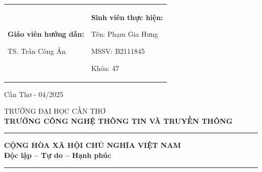 \documentclass[13pt, a4paper]{report}
\begin{document}
\begin{titlepage}
    \vfill %
    
    \noindent
    \begin{minipage}{\textwidth}
        \begin{tabular}{p{} p{}}
            \fontsize{13}{15}\selectfont \raggedright \textbf{Giáo viên hướng dẫn:} \par TS. Trần Công Án 
            & 
            \fontsize{13}{15}\selectfont \raggedright \textbf{Sinh viên thực hiện:} \par Tên: Phạm Gia Hưng \par MSSV: B2111845 \par Khóa: 47 \\
        \end{tabular}
    \end{minipage}

    \vfill %
    
    {\fontsize{13}{15}\selectfont Cần Thơ - 04/2025\par}
    \vspace{1cm} %
\end{titlepage}



\clearpage
\thispagestyle{empty}

\begin{center}
    \begin{minipage}[t]{0.48\textwidth}
        \centering
        \fontsize{13}{15}\selectfont TRƯỜNG ĐẠI HỌC CẦN THƠ \\
        \textbf{TRƯỜNG CÔNG NGHỆ THÔNG TIN VÀ TRUYỀN THÔNG} \\
        \rule{0.8\textwidth}{0.4pt}
    \end{minipage}
    \hfill
    \begin{minipage}[t]{0.48\textwidth}
        \centering
        \fontsize{13}{15}\selectfont \textbf{CỘNG HÒA XÃ HỘI CHỦ NGHĨA VIỆT NAM} \\
        \textbf{Độc lập – Tự do – Hạnh phúc} \\
        \rule{0.8\textwidth}{0.4pt}
    \end{minipage}
\end{center}

\vfill %
\end{document}
